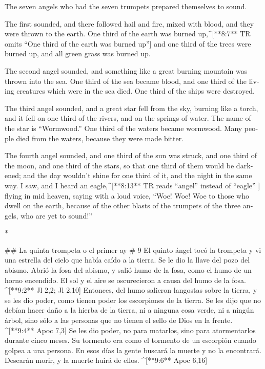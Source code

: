 \begin{paracols}{2}
\begin{english}
 The seven angels who had the seven trumpets prepared themselves to sound. 

 The first sounded, and there followed hail and fire, mixed with blood, and they were thrown to the earth. One third of the earth was burned up,^[**8:7** TR omits “One third of the earth was burned up”] and one third of the trees were burned up, and all green grass was burned up. 

 The second angel sounded, and something like a great burning mountain was thrown into the sea. One third of the sea became blood,  and one third of the living creatures which were in the sea died. One third of the ships were destroyed. 

 The third angel sounded, and a great star fell from the sky, burning like a torch, and it fell on one third of the rivers, and on the springs of water.  The name of the star is “Wormwood.” One third of the waters became wormwood. Many people died from the waters, because they were made bitter. 

 The fourth angel sounded, and one third of the sun was struck, and one third of the moon, and one third of the stars, so that one third of them would be darkened; and the day wouldn’t shine for one third of it, and the night in the same way.  I saw, and I heard an eagle,^[**8:13** TR reads “angel” instead of “eagle” ] flying in mid heaven, saying with a loud voice, “Woe! Woe! Woe to those who dwell on the earth, because of the other blasts of the trumpets of the three angels, who are yet to sound!”

\end{english}
\switchcolumn[0]*

## La quinta trompeta o el primer ay
# 9
 El quinto ángel tocó la trompeta y vi una estrella del cielo que había caído a la tierra. Se le dio la llave del pozo del abismo.  Abrió la fosa del abismo, y salió humo de la fosa, como el humo de un horno encendido. El sol y el aire se oscurecieron a causa del humo de la fosa. ^[**9:2** Jl 2,2; Jl 2,10]  Entonces, del humo salieron langostas sobre la tierra, y se les dio poder, como tienen poder los escorpiones de la tierra.  Se les dijo que no debían hacer daño a la hierba de la tierra, ni a ninguna cosa verde, ni a ningún árbol, sino sólo a las personas que no tienen el sello de Dios en la frente. ^[**9:4** Apoc 7,3]  Se les dio poder, no para matarlos, sino para atormentarlos durante cinco meses. Su tormento era como el tormento de un escorpión cuando golpea a una persona.  En esos días la gente buscará la muerte y no la encontrará. Desearán morir, y la muerte huirá de ellos. ^[**9:6** Apoc 6,16]


\end{paracols}
